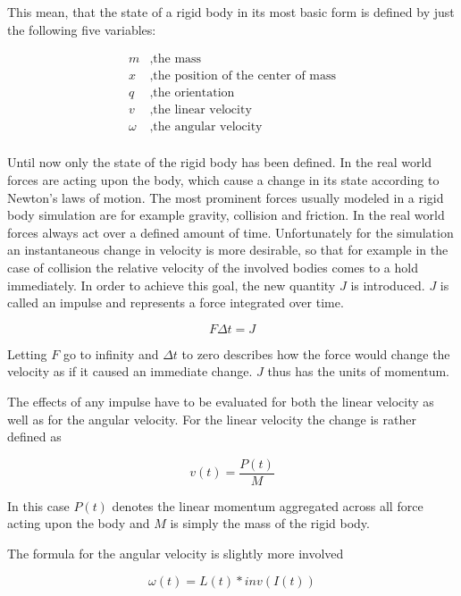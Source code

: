 This mean, that the state of a rigid body in its most basic form is defined by just the following five variables:

\begin{align*}
m &, \text{the mass} \\
x &, \text{the position of the center of mass} \\
q &, \text{the orientation} \\
v &, \text{the linear velocity} \\
\omega &, \text{the angular velocity} \\
\end{align*}

Until now only the state of the rigid body has been defined. In the real world forces are acting upon the body, which cause a change in its state according to Newton's laws of motion. The most prominent forces usually modeled in a rigid body simulation are for example gravity, collision and friction. In the real world forces always act over a defined amount of time. Unfortunately for the simulation an instantaneous change in velocity is more desirable, so that for example in the case of collision the relative velocity of the involved bodies comes to a hold immediately. In order to achieve this goal, the new quantity $J$ is introduced. $J$ is called an impulse and represents a force integrated over time.

\begin{equation}
F \Delta t = J
\end{equation}

Letting $F$ go to infinity and $\Delta t$ to zero describes how the force would change the velocity as if it caused an immediate change. $J$ thus has the units of momentum. 

The effects of any impulse have to be evaluated for both the linear velocity as well as for the angular velocity. For the linear velocity the change is rather defined as

\begin{equation}
v(t) = \frac{P(t)}{M}
\end{equation}

In this case $P(t)$ denotes the linear momentum aggregated across all force acting upon the body and $M$ is simply the mass of the rigid body.

The formula for the angular velocity is slightly more involved

\begin{equation}
\omega(t) = L(t) * inv(I(t))
\end{equation}

